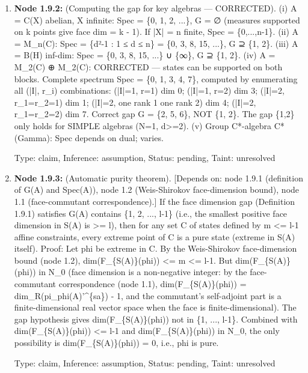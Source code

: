 \documentclass{article}
\begin{document}
\begin{enumerate}
\begin{enumerate}
  Type: claim, Inference: assumption, Status: pending, Taint: unresolved

\item \textbf{Node 1.9.2:} (Computing the gap for key algebras — CORRECTED). (i) A = C(X) abelian, X infinite: Spec = \{0, 1, 2, ...\}, G = ∅ (measures supported on k points give face dim = k - 1). If |X| = n finite, Spec = \{0,...,n-1\}. (ii) A = M\_n(C): Spec = \{d²-1 : 1 ≤ d ≤ n\} = \{0, 3, 8, 15, ...\}, G ⊇ \{1, 2\}. (iii) A = B(H) inf-dim: Spec = \{0, 3, 8, 15, ...\} ∪ \{∞\}, G ⊇ \{1, 2\}. (iv) A = M\_2(C) ⊕ M\_2(C): CORRECTED — states can be supported on both blocks. Complete spectrum Spec = \{0, 1, 3, 4, 7\}, computed by enumerating all (|I|, r\_i) combinations: (|I|=1, r=1) dim 0; (|I|=1, r=2) dim 3; (|I|=2, r\_1=r\_2=1) dim 1; (|I|=2, one rank 1 one rank 2) dim 4; (|I|=2, r\_1=r\_2=2) dim 7. Correct gap G = \{2, 5, 6\}, NOT \{1, 2\}. The gap \{1,2\} only holds for SIMPLE algebras (N=1, d>=2). (v) Group C*-algebra C*(Gamma): Spec depends on dual; varies.

  Type: claim, Inference: assumption, Status: pending, Taint: unresolved

\item \textbf{Node 1.9.3:} (Automatic purity theorem). [Depends on: node 1.9.1 (definition of G(A) and Spec(A)), node 1.2 (Weis-Shirokov face-dimension bound), node 1.1 (face-commutant correspondence).] If the face dimension gap (Definition 1.9.1) satisfies G(A) contains \{1, 2, ..., l-1\} (i.e., the smallest positive face dimension in S(A) is >= l), then for any set C of states defined by m <= l-1 affine constraints, every extreme point of C is a pure state (extreme in S(A) itself). Proof: Let phi be extreme in C. By the Weis-Shirokov face-dimension bound (node 1.2), dim(F\_\{S(A)\}(phi)) <= m <= l-1. But dim(F\_\{S(A)\}(phi)) in N\_0 (face dimension is a non-negative integer: by the face-commutant correspondence (node 1.1), dim(F\_\{S(A)\}(phi)) = dim\_R(pi\_phi(A)'\textasciicircum{}\{sa\}) - 1, and the commutant's self-adjoint part is a finite-dimensional real vector space when the face is finite-dimensional). The gap hypothesis gives dim(F\_\{S(A)\}(phi)) not in \{1, ..., l-1\}. Combined with dim(F\_\{S(A)\}(phi)) <= l-1 and dim(F\_\{S(A)\}(phi)) in N\_0, the only possibility is dim(F\_\{S(A)\}(phi)) = 0, i.e., phi is pure.

  Type: claim, Inference: assumption, Status: pending, Taint: unresolved


\end{enumerate}
\end{enumerate}
\end{document}
